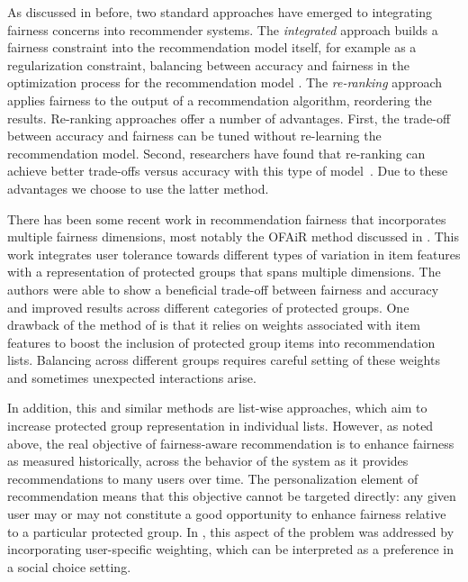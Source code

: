 As discussed in before, two standard approaches have emerged to integrating fairness concerns into recommender systems. The \textit{integrated} approach builds a fairness constraint into the recommendation model itself, for example as a regularization constraint, balancing between accuracy and fairness in the optimization process for the recommendation model \cite{kamishima2012fairness,yao2017beyond}. The \textit{re-ranking} approach applies fairness to the output of a recommendation algorithm, reordering the results. Re-ranking approaches offer a number of advantages. First, the trade-off between accuracy and fairness can be tuned without re-learning the recommendation model. Second, researchers have found that re-ranking can achieve better trade-offs versus accuracy with this type of model~\cite{pmlr-v81-ekstrand18b,abdollahpouri2019managing,liu2019personalized}. Due to these advantages we choose to use the latter method.

There has been some recent work in recommendation fairness that incorporates multiple fairness dimensions, most notably the OFAiR method discussed in \cite{sonboli-umap-2020}. This work integrates user tolerance towards different types of variation in item features with a representation of protected groups that spans multiple dimensions. The authors were able to show a beneficial trade-off between fairness and accuracy and improved results across different categories of protected groups. One drawback of the method of \cite{sonboli-umap-2020} is that it relies on weights associated with item features to boost the inclusion of protected group items into recommendation lists. Balancing across different groups requires careful setting of these weights and sometimes unexpected interactions arise.

In addition, this and similar methods are list-wise approaches, which aim to increase protected group representation in individual lists. However, as noted above, the real objective of fairness-aware recommendation is to enhance fairness as measured historically, across the behavior of the system as it provides recommendations to many users over time. The personalization element of recommendation means that this objective cannot be targeted directly: any given user may or may not constitute a good opportunity to enhance fairness relative to a particular protected group. In \cite{sonboli-umap-2020}, this aspect of the problem was addressed by incorporating user-specific weighting, which can be interpreted as a preference in a social choice setting. 

